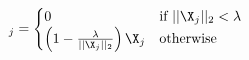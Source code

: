 \documentclass[preview,border=0.3pt]{standalone}
\begin{document}
%
\begin{equation*}
[\mathrm{prox}_{g}(\X)]_j = 
    \begin{cases}
        0&\text{if}\ ||\X_j||_2 < \lambda\\
        \left(1-\frac{\lambda}{||\X_j||_2}\right)\X_j&\text{otherwise}\\
    \end{cases}\label{eq:}
\end{equation*}
\end{document}
